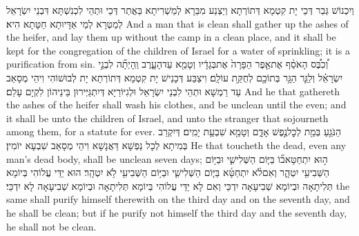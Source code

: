 {וְיִכְנוֹשׁ גְּבַר דְּכֵי יָת קִטְמָא דְּתוֹרְתָא וְיַצְנַע מִבַּרָא לְמַשְׁרִיתָא בַּאֲתַר דְּכֵי וּתְהֵי לִכְנִשְׁתָּא דִּבְנֵי יִשְׂרָאֵל לְמַטְּרָא לְמֵי אַדָּיוּתָא חַטָּתָא הִיא׃}
{And a man that is clean shall gather up the ashes of the heifer, and lay them up without the camp in a clean place, and it shall be kept for the congregation of the children of Israel for a water of sprinkling; it is a purification from sin.}{}
{וְ֠כִבֶּ֠ס הָאֹסֵ֨ף אֶת\maqqaf אֵ֤פֶר הַפָּרָה֙ אֶת\maqqaf בְּגָדָ֔יו וְטָמֵ֖א עַד\maqqaf הָעָ֑רֶב וְֽהָיְתָ֞ה לִבְנֵ֣י יִשְׂרָאֵ֗ל וְלַגֵּ֛ר הַגָּ֥ר בְּתוֹכָ֖ם לְחֻקַּ֥ת עוֹלָֽם׃}
{וִיצַבַּע דְּכָנֵישׁ יָת קִטְמָא דְּתוֹרְתָא יָת לְבוּשׁוֹהִי וִיהֵי מְסָאַב עַד רַמְשָׁא וּתְהֵי לִבְנֵי יִשְׂרָאֵל וּלְגִיּוֹרַיָּא דְּיִתְגַּיְּירוּן בֵּינֵיהוֹן לִקְיָם עָלַם׃}
{And he that gathereth the ashes of the heifer shall wash his clothes, and be unclean until the even; and it shall be unto the children of Israel, and unto the stranger that sojourneth among them, for a statute for ever.}{}
{הַנֹּגֵ֥עַ בְּמֵ֖ת לְכׇל\maqqaf נֶ֣פֶשׁ אָדָ֑ם וְטָמֵ֖א שִׁבְעַ֥ת יָמִֽים׃}
{דְּיִקְרַב בְּמִיתָא לְכָל נַפְשָׁא דַּאֲנָשָׁא וִיהֵי מְסָאַב שִׁבְעָא יוֹמִין׃}
{He that toucheth the dead, even any man’s dead body, shall be unclean seven days;}{}
{ה֣וּא יִתְחַטָּא\maqqaf ב֞וֹ בַּיּ֧וֹם הַשְּׁלִישִׁ֛י וּבַיּ֥וֹם הַשְּׁבִיעִ֖י יִטְהָ֑ר וְאִם\maqqaf לֹ֨א יִתְחַטָּ֜א בַּיּ֧וֹם הַשְּׁלִישִׁ֛י וּבַיּ֥וֹם הַשְּׁבִיעִ֖י לֹ֥א יִטְהָֽר׃}
{הוּא יַדֵּי עֲלוֹהִי בְּיוֹמָא תְּלִיתָאָה וּבְיוֹמָא שְׁבִיעָאָה יִדְכֵּי וְאִם לָא יַדֵּי עֲלוֹהִי בְּיוֹמָא תְּלִיתָאָה וּבְיוֹמָא שְׁבִיעָאָה לָא יִדְכֵּי׃}
{the same shall purify himself therewith on the third day and on the seventh day, and he shall be clean; but if he purify not himself the third day and the seventh day, he shall not be clean.}{}
